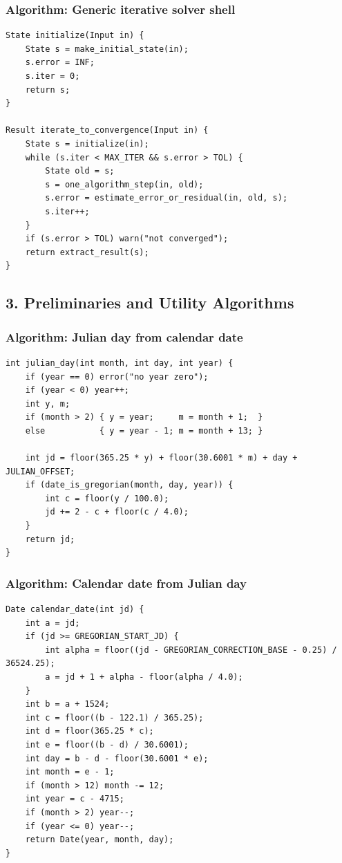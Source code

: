 \documentclass[11pt]{article}
\begin{document}
\subsubsection{Algorithm: Generic iterative solver shell}\label{algorithm-generic-iterative-solver-shell}

\begin{verbatim}
State initialize(Input in) {
    State s = make_initial_state(in);
    s.error = INF;
    s.iter = 0;
    return s;
}

Result iterate_to_convergence(Input in) {
    State s = initialize(in);
    while (s.iter < MAX_ITER && s.error > TOL) {
        State old = s;
        s = one_algorithm_step(in, old);
        s.error = estimate_error_or_residual(in, old, s);
        s.iter++;
    }
    if (s.error > TOL) warn("not converged");
    return extract_result(s);
}
\end{verbatim}

\subsection{3. Preliminaries and Utility Algorithms}\label{preliminaries-and-utility-algorithms}

\subsubsection{Algorithm: Julian day from calendar date}\label{algorithm-julian-day-from-calendar-date}

\begin{verbatim}
int julian_day(int month, int day, int year) {
    if (year == 0) error("no year zero");
    if (year < 0) year++;
    int y, m;
    if (month > 2) { y = year;     m = month + 1;  }
    else           { y = year - 1; m = month + 13; }

    int jd = floor(365.25 * y) + floor(30.6001 * m) + day + JULIAN_OFFSET;
    if (date_is_gregorian(month, day, year)) {
        int c = floor(y / 100.0);
        jd += 2 - c + floor(c / 4.0);
    }
    return jd;
}
\end{verbatim}

\subsubsection{Algorithm: Calendar date from Julian day}\label{algorithm-calendar-date-from-julian-day}

\begin{verbatim}
Date calendar_date(int jd) {
    int a = jd;
    if (jd >= GREGORIAN_START_JD) {
        int alpha = floor((jd - GREGORIAN_CORRECTION_BASE - 0.25) / 36524.25);
        a = jd + 1 + alpha - floor(alpha / 4.0);
    }
    int b = a + 1524;
    int c = floor((b - 122.1) / 365.25);
    int d = floor(365.25 * c);
    int e = floor((b - d) / 30.6001);
    int day = b - d - floor(30.6001 * e);
    int month = e - 1;
    if (month > 12) month -= 12;
    int year = c - 4715;
    if (month > 2) year--;
    if (year <= 0) year--;
    return Date(year, month, day);
}
\end{verbatim}
\end{document}
